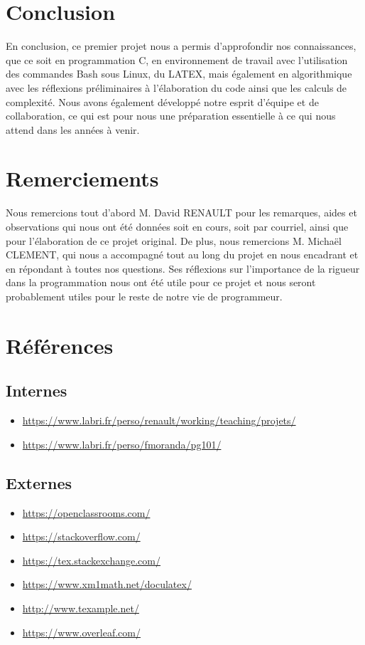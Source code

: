 \documentclass{article}
\begin{document}
\newpage
\section{Conclusion}

En conclusion, ce premier projet nous a permis d’approfondir nos connaissances, que ce soit
en programmation C, en environnement de travail avec l’utilisation des commandes Bash sous
Linux, du LATEX, mais également en algorithmique avec les réflexions préliminaires à l'élaboration du code ainsi que les calculs de complexité. Nous avons
également développé notre esprit d’équipe et de collaboration, ce qui est pour nous une préparation essentielle à ce qui nous attend dans les années à venir. 

\section{Remerciements}
Nous remercions tout d'abord M. David RENAULT pour les remarques, aides et observations qui nous ont été données soit en cours, soit par courriel, ainsi que pour l'élaboration de ce projet original. De plus, nous remercions M. Micha\"el CLEMENT, qui nous a accompagné tout au long du projet en nous encadrant et en répondant à toutes nos questions. Ses réflexions sur l'importance de la rigueur dans la programmation nous ont été utile pour ce projet et nous seront probablement utiles pour le reste de notre vie de programmeur. 

\section{Références}
\subsection{Internes}
\begin{itemize}
    \item \url{https://www.labri.fr/perso/renault/working/teaching/projets/}
    \item \url{https://www.labri.fr/perso/fmoranda/pg101/}
\end{itemize}
\subsection{Externes}
\begin{itemize}
    \item \url{https://openclassrooms.com/}
    \item \url{https://stackoverflow.com/}
    \item \url{https://tex.stackexchange.com/}
    \item \url{https://www.xm1math.net/doculatex/}
    \item \url{http://www.texample.net/}
    \item \url{https://www.overleaf.com/}
\end{itemize}
\end{document}
